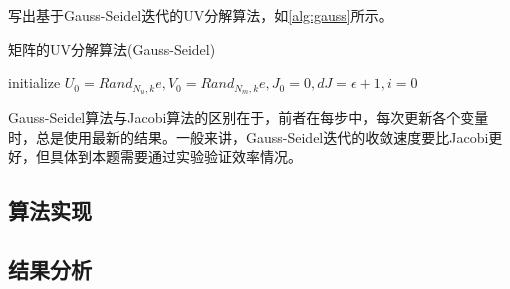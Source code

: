 \documentclass[a4paper,12pt]{article}
\begin{document}
    写出基于Gauss-Seidel迭代的UV分解算法，如\cref{alg:gauss}所示。
    \begin{algorithm}
        \caption{矩阵的UV分解算法(Gauss-Seidel)}
        \label{alg:gauss}

        initialize $U_0=Rand_{N_u,k}e, V_0=Rand_{N_m,k}e, J_0=0, dJ = \epsilon + 1, i=0$\;
    \end{algorithm}

    Gauss-Seidel算法与Jacobi算法的区别在于，前者在每步中，每次更新各个变量时，总是使用最新的结果。一般来讲，Gauss-Seidel迭代的收敛速度要比Jacobi更好，但具体到本题需要通过实验验证效率情况。
    \subsection{算法实现}

    \subsection{结果分析}

    \label{applastpage}
    \newpage
    
    
\iffalse
\begin{itemize}[noitemsep,topsep=0pt]
\end{itemize}
\begin{enumerate}[label=\Roman{*}.,noitemsep,topsep=0pt]
\end{enumerate}
\begin{multicols}{2}
\end{multicols}
\fi
\end{document}

